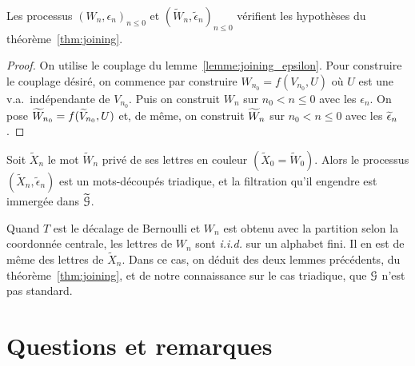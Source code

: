 \documentclass[12pt,a4paper]{article}
\begin{document}
\begin{lemme}
Les processus ${(W_n, \epsilon_n)}_{n \leq 0}$ et 
${(\widetilde{W}_n, \widetilde{\epsilon}_n)}_{n \leq 0}$ 
vérifient les hypothèses du théorème~\ref{thm:joining}. 
\end{lemme}

\begin{proof}
On utilise le couplage du lemme~\ref{lemme:joining_epsilon}. 
Pour construire le couplage désiré, on commence par construire $W_{n_0} = f(V_{n_0}, U)$ 
où $U$ est une v.a.\ indépendante de $V_{n_0}$. 
Puis on construit $W_n$ sur $n_0 < n \leq 0$ avec les $\epsilon_n$. 
On pose $\widetilde{W}_{n_0} = f(\widetilde{V}_{n_0}, U)$ et, de même, on 
 construit $\widetilde{W}_n$ sur $n_0 < n \leq 0$ avec les $\widetilde{\epsilon}_n$. 
\end{proof}

\begin{lemme}
Soit $\widetilde{X}_n$ le mot $\widetilde{W}_n$ privé de ses lettres en couleur $(\widetilde{X}_0=\widetilde{W}_0)$. 
Alors le processus $(\widetilde{X}_n, \widetilde{\epsilon}_n)$ est un mots-découpés triadique, 
et la filtration qu'il engendre est immergée dans $\widetilde{\EuScript{G}}$.
\end{lemme}

Quand $T$ est le décalage de Bernoulli et $W_n$ est obtenu avec la partition 
selon la coordonnée centrale, les lettres de $W_n$ sont \emph{i.i.d.} sur un alphabet 
fini. Il en est de même des lettres de $\widetilde{X}_n$. 
Dans ce cas, on déduit des deux lemmes précédents, du théorème~\ref{thm:joining}, 
et de notre connaissance sur le cas triadique, que $\EuScript{G}$ n'est pas standard. 

\section{Questions et remarques} 
\end{document}
